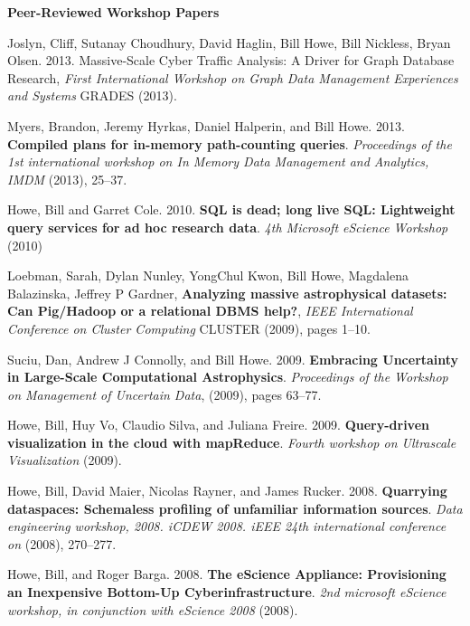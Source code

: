 {\bf Peer-Reviewed Workshop Papers}
\begin{bulletlist}

\item Joslyn, Cliff, Sutanay Choudhury, David Haglin, Bill Howe, Bill Nickless, Bryan Olsen. 2013. Massive-Scale Cyber Traffic Analysis: A Driver for Graph Database Research,
\emph{First International Workshop on Graph Data Management Experiences and Systems} GRADES (2013).

\item Myers, Brandon, Jeremy Hyrkas, Daniel Halperin, and Bill
Howe. 2013. \textbf{Compiled plans for in-memory path-counting queries}.
\emph{Proceedings of the 1st international workshop on In Memory Data
Management and Analytics, IMDM} (2013), 25--37. 

\item Howe, Bill and Garret Cole. 2010. 
\textbf{SQL is dead; long live SQL: Lightweight query services for ad hoc research data}.
\emph{4th Microsoft eScience Workshop} (2010)

\item Loebman, Sarah, Dylan Nunley, YongChul Kwon, Bill Howe, Magdalena Balazinska, Jeffrey P Gardner, \textbf{Analyzing massive astrophysical datasets: Can Pig/Hadoop or a relational DBMS help?}, 
\emph{IEEE International Conference on Cluster Computing} CLUSTER (2009), pages 1--10.

\item Suciu, Dan, Andrew J Connolly, and Bill Howe. 2009. 
\textbf{Embracing Uncertainty in Large-Scale Computational Astrophysics}.
\emph{Proceedings of the Workshop on Management of Uncertain Data}, (2009),
  pages 63--77.

\item Howe, Bill, Huy Vo, Claudio Silva, and Juliana
Freire. 2009. \textbf{Query-driven visualization in the cloud with mapReduce}.
\emph{Fourth workshop on Ultrascale Visualization} (2009). 

\item Howe, Bill, David Maier, Nicolas Rayner, and James
Rucker. 2008. \textbf{Quarrying dataspaces: Schemaless profiling of unfamiliar
information sources}. \emph{Data engineering workshop, 2008. iCDEW 2008.
iEEE 24th international conference on} (2008), 270--277. 

\item Howe, Bill, and Roger Barga.
2008. \textbf{The eScience Appliance: Provisioning an Inexpensive Bottom-Up
Cyberinfrastructure}. \emph{2nd microsoft eScience workshop, in
conjunction with eScience 2008} (2008). 


\end{bulletlist}
